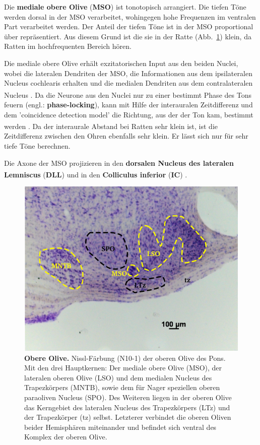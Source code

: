 \documentclass[12pt,a4paper,pdftex]{article}
\begin{document}
\noindent Die \textbf{mediale obere Olive} (\textbf{MSO}) ist tonotopisch arrangiert. Die tiefen Töne werden dorsal in der MSO verarbeitet, wohingegen hohe Frequenzen im ventralen Part verarbeitet werden. Der Anteil der tiefen Töne ist in der MSO proportional über repräsentiert. Aus diesem Grund ist die sie in der Ratte (Abb.~\ref{fig:obere_Olive}) klein, da Ratten im hochfrequenten Bereich hören.

Die mediale obere Olive erhält exzitatorischen Input aus den beiden Nuclei, wobei die lateralen Dendriten der MSO, die Informationen aus dem ipsilateralen Nucleus cochlearis erhalten und die medialen Dendriten aus dem contralateralen Nucleus \textsuperscript{\cite[29]{paxinos2014rat}}. Da die Neurone aus den Nuclei nur zu einer bestimmt Phase des Tons feuern (engl.: \textbf{phase-locking}), kann mit Hilfe der interauralen Zeitdifferenz und dem 'coincidence detection model' die Richtung, aus der der Ton kam, bestimmt werden \textsuperscript{\cite[31]{kandel2013principles}}. Da der interaurale Abstand bei Ratten sehr klein ist, ist die Zeitdifferenz zwischen den Ohren ebenfalls sehr klein. Er lässt sich nur für sehr tiefe Töne berechnen.

Die Axone der MSO projizieren in den \textbf{dorsalen Nucleus des lateralen Lemniscus} (\textbf{DLL}) und in den \textbf{Colliculus inferior} (\textbf{IC}) \textsuperscript{\cite[29]{paxinos2014rat}}.
\\

\begin{figure}[H]
    \centering
    \includegraphics{pictures/auditory/obere_olive.png}
    \caption[Obere Olive]{\textbf{Obere Olive.} Nissl-Färbung (N10-1) der oberen Olive des Pons. Mit den drei Hauptkernen: Der mediale obere Olive (MSO), der lateralen oberen Olive (LSO) und dem medialen Nucleus des Trapezkörpers (MNTB), sowie dem für Nager speziellen oberen paraoliven Nucleus (SPO). Des Weiteren liegen in der oberen Olive das Kerngebiet des lateralen Nucleus des Trapezkörpers (LTz) und der Trapezkörper (tz) selbst. Letzterer verbindet die oberen Oliven beider Hemisphären miteinander und befindet sich ventral des Komplex der oberen Olive.}
    \label{fig:obere_Olive}
\end{figure}
\end{document}
